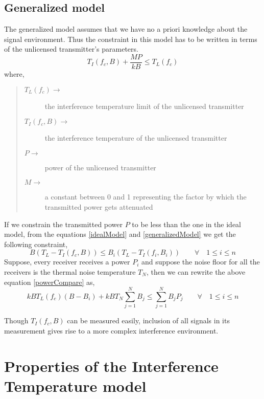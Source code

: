 \documentclass[12pt]{article}
\begin{document}
\subsection{Generalized model}

The generalized model assumes that we have no a priori knowledge about the signal environment. Thus the constraint in this model has to be written in terms of the unlicensed transmitter's parameters.
\begin{equation}
    T_I(f_c,B) + \frac{MP}{kB} \leq T_L(f_c) \label{generalizedModel}
\end{equation}
where,
\begin{quote}
\begin{description}
    \item[$T_L(f_c)\longrightarrow$] the interference temperature limit of the unlicensed transmitter
    \item[$T_I(f_c,B)\longrightarrow$] the interference temperature of the unlicensed transmitter
    \item[$P\longrightarrow$] power of the unlicensed transmitter
    \item[$M\longrightarrow$] a constant between 0 and 1 representing the factor by which the transmitted power gets attenuated
\end{description}
\end{quote}

If we constrain the transmitted power $P$ to be less than the one in the ideal model, from the equations \eqref{idealModel} and \eqref{generalizedModel} we get the following constraint,
\begin{equation}
    B(T_L - T_I(f_c,B)) \leq  B_i(T_L - T_I(f_i,B_i)) \qquad \forall \quad 1 \leq i \leq n \label{powerCompare}
\end{equation}
Suppose, every receiver receives a power $P_i$ and suppose the noise floor for all the receivers is the thermal noise temperature $T_N$, then we can rewrite the above equation \eqref{powerCompare} as,
\begin{equation}
    kBT_L(f_c)(B-B_i) + kBT_N\sum_{j=1}^{N}B_j \leq \sum_{j=1}^{N}B_jP_j \qquad \forall \quad 1 \leq i\leq n
\end{equation}

Though $T_I(f_c,B)$ can be measured easily, inclusion of all signals in its measurement gives rise to a more complex interference environment.


\section{Properties of the Interference Temperature model}
\end{document}
